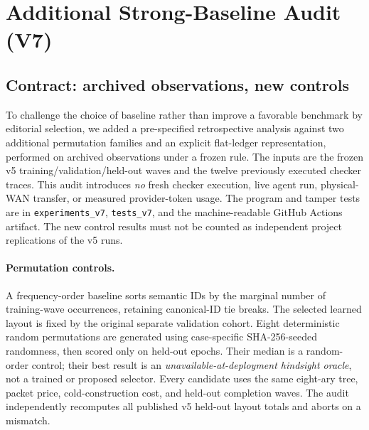 \section{Additional Strong-Baseline Audit (V7)}\label{sec:v7baseline}
\subsection{Contract: archived observations, new controls}
To challenge the choice of baseline rather than improve a favorable benchmark by editorial selection, we added a pre-specified retrospective analysis against two additional permutation families and an explicit flat-ledger representation, performed on archived observations under a frozen rule. The inputs are the frozen v5 training/validation/held-out waves and the twelve previously executed checker traces. This audit introduces \emph{no} fresh checker execution, live agent run, physical-WAN transfer, or measured provider-token usage. The program and tamper tests are in \texttt{experiments\_v7}, \texttt{tests\_v7}, and the machine-readable GitHub Actions artifact. The new control results must not be counted as independent project replications of the v5 runs.

\paragraph{Permutation controls.}
A frequency-order baseline sorts semantic IDs by the marginal number of training-wave occurrences, retaining canonical-ID tie breaks. The selected learned layout is fixed by the original separate validation cohort. Eight deterministic random permutations are generated using case-specific SHA-256-seeded randomness, then scored only on held-out epochs. Their median is a random-order control; their best result is an \emph{unavailable-at-deployment hindsight oracle}, not a trained or proposed selector. Every candidate uses the same eight-ary tree, packet price, cold-construction cost, and held-out completion waves. The audit independently recomputes all published v5 held-out layout totals and aborts on a mismatch.

